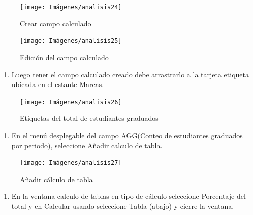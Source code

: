 \documentclass[
]{book}
\providecommand{\tightlist}{%
  \setlength{\itemsep}{0pt}\setlength{\parskip}{0pt}}
\begin{document}
\begin{figure}

{\centering \texttt{[image: Imágenes/analisis24]} 

}

\caption{Crear campo calculado}\label{fig:crearcampocalculadopaso1-fig}
\end{figure}

\begin{figure}

{\centering \texttt{[image: Imágenes/analisis25]} 

}

\caption{Edición del campo calculado}\label{fig:crearcampocalculadopaso1-1-fig}
\end{figure}

\begin{enumerate}
\def\labelenumi{\arabic{enumi}.}
\setcounter{enumi}{1}
\tightlist
\item
  Luego tener el campo calculado creado debe arrastrarlo a la tarjeta etiqueta ubicada en el estante Marcas.
\end{enumerate}

\begin{figure}

{\centering \texttt{[image: Imágenes/analisis26]} 

}

\caption{Etiquetas del total de estudiantes graduados}\label{fig:etiquetas-fig}
\end{figure}

\begin{enumerate}
\def\labelenumi{\arabic{enumi}.}
\setcounter{enumi}{2}
\tightlist
\item
  En el menú desplegable del campo AGG(Conteo de estudiantes graduados por periodo), seleccione Añadir calculo de tabla.
\end{enumerate}

\begin{figure}

{\centering \texttt{[image: Imágenes/analisis27]} 

}

\caption{Añadir cálculo de tabla}\label{fig:crearcalculodetabla-fig}
\end{figure}

\begin{enumerate}
\def\labelenumi{\arabic{enumi}.}
\setcounter{enumi}{3}
\tightlist
\item
  En la ventana calculo de tablas en tipo de cálculo seleccione Porcentaje del total y en Calcular usando seleccione Tabla (abajo) y cierre la ventana.
\end{enumerate}
\end{document}
